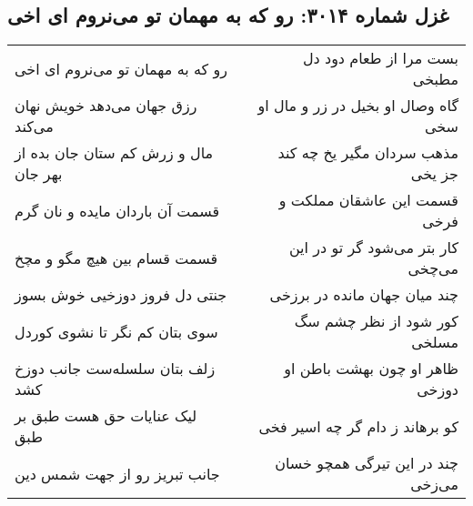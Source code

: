 \begin{center}
\section*{غزل شماره ۳۰۱۴: رو که به مهمان تو می‌نروم ای اخی}
\label{sec:3014}
\begin{longtable}{l p{0.5cm} r}
رو که به مهمان تو می‌نروم ای اخی
&&
بست مرا از طعام دود دل مطبخی
\\
رزق جهان می‌دهد خویش نهان می‌کند
&&
گاه وصال او بخیل در زر و مال او سخی
\\
مال و زرش کم ستان جان بده از بهر جان
&&
مذهب سردان مگیر یخ چه کند جز یخی
\\
قسمت آن باردان مایده و نان گرم
&&
قسمت این عاشقان مملکت و فرخی
\\
قسمت قسام بین هیچ مگو و مچخ
&&
کار بتر می‌شود گر تو در این می‌چخی
\\
جنتی دل فروز دوزخیی خوش بسوز
&&
چند میان جهان مانده در برزخی
\\
سوی بتان کم نگر تا نشوی کوردل
&&
کور شود از نظر چشم سگ مسلخی
\\
زلف بتان سلسله‌ست جانب دوزخ کشد
&&
ظاهر او چون بهشت باطن او دوزخی
\\
لیک عنایات حق هست طبق بر طبق
&&
کو برهاند ز دام گر چه اسیر فخی
\\
جانب تبریز رو از جهت شمس دین
&&
چند در این تیرگی همچو خسان می‌زخی
\\
\end{longtable}
\end{center}
